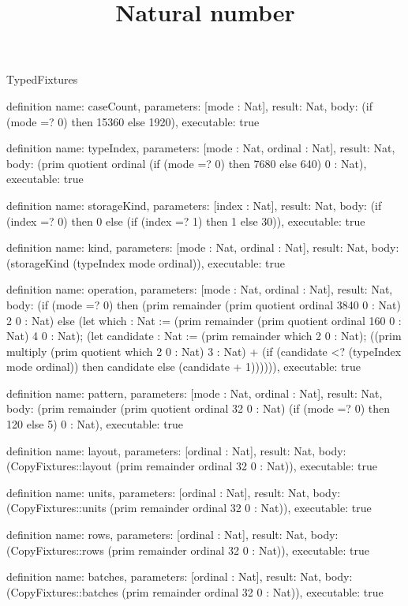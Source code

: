\begin{lexlean}{TypedFixtures}
\title{Natural number}
\begin{semanticmodule}
definition{
  name: caseCount,
  parameters: [mode : Nat],
  result: Nat,
  body: (if (mode =? 0) then 15360 else 1920),
  executable: true
}

definition{
  name: typeIndex,
  parameters: [mode : Nat, ordinal : Nat],
  result: Nat,
  body: (prim quotient ordinal (if (mode =? 0) then 7680 else 640) 0 : Nat),
  executable: true
}

definition{
  name: storageKind,
  parameters: [index : Nat],
  result: Nat,
  body: (if (index =? 0) then 0 else (if (index =? 1) then 1 else 30)),
  executable: true
}

definition{
  name: kind,
  parameters: [mode : Nat, ordinal : Nat],
  result: Nat,
  body: (storageKind (typeIndex mode ordinal)),
  executable: true
}

definition{
  name: operation,
  parameters: [mode : Nat, ordinal : Nat],
  result: Nat,
  body: (if (mode =? 0) then (prim remainder (prim quotient ordinal 3840 0 : Nat) 2 0 : Nat) else (let which : Nat := (prim remainder (prim quotient ordinal 160 0 : Nat) 4 0 : Nat); (let candidate : Nat := (prim remainder which 2 0 : Nat); ((prim multiply (prim quotient which 2 0 : Nat) 3 : Nat) + (if (candidate <? (typeIndex mode ordinal)) then candidate else (candidate + 1)))))),
  executable: true
}

definition{
  name: pattern,
  parameters: [mode : Nat, ordinal : Nat],
  result: Nat,
  body: (prim remainder (prim quotient ordinal 32 0 : Nat) (if (mode =? 0) then 120 else 5) 0 : Nat),
  executable: true
}

definition{
  name: layout,
  parameters: [ordinal : Nat],
  result: Nat,
  body: (CopyFixtures::layout (prim remainder ordinal 32 0 : Nat)),
  executable: true
}

definition{
  name: units,
  parameters: [ordinal : Nat],
  result: Nat,
  body: (CopyFixtures::units (prim remainder ordinal 32 0 : Nat)),
  executable: true
}

definition{
  name: rows,
  parameters: [ordinal : Nat],
  result: Nat,
  body: (CopyFixtures::rows (prim remainder ordinal 32 0 : Nat)),
  executable: true
}

definition{
  name: batches,
  parameters: [ordinal : Nat],
  result: Nat,
  body: (CopyFixtures::batches (prim remainder ordinal 32 0 : Nat)),
  executable: true
}


\end{semanticmodule}
\end{lexlean}
